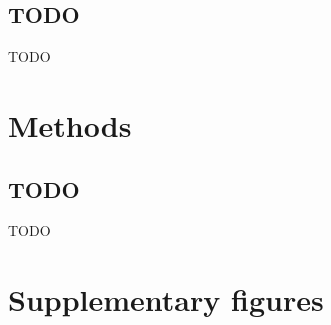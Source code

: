 \documentclass[a4paper,11pt,abstracton,hidelinks]{scrartcl}
\newcommand{\beginsupplement}{%
  \setcounter{table}{0}
  \renewcommand{\thetable}{S\arabic{table}}%
  \setcounter{figure}{0}
  \renewcommand{\thefigure}{S\arabic{figure}}%
}
\begin{document}
\subsection*{TODO}


TODO


\section*{Methods}


\subsection*{TODO}

TODO


\printbibliography


\beginsupplement
\clearpage


\section*{Supplementary figures}
\end{document}
